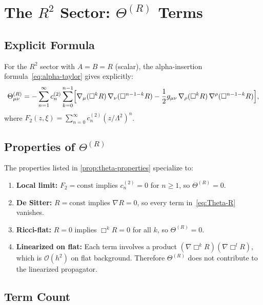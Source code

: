 \documentclass[11pt,a4paper]{article}
\theoremstyle{plain}
\theoremstyle{definition}
\begin{document}
\section{The $R^2$ Sector: $\Theta^{(R)}$ Terms}\label{sec:theta-R}

\subsection{Explicit Formula}

For the $R^2$ sector with $A = B = R$ (scalar), the alpha-insertion
formula~\eqref{eq:alpha-taylor} gives explicitly:
\begin{equation}\label{eq:Theta-R}
  \Theta^{(R)}_{\mu\nu} = -\sum_{n=1}^{\infty} c_n^{(2)}
  \sum_{k=0}^{n-1}
  \Bigl[\nabla_\mu(\Box^k R)\,\nabla_\nu(\Box^{n-1-k} R)
  - \frac{1}{2}g_{\mu\nu}\,\nabla_\rho(\Box^k R)\,
  \nabla^\rho(\Box^{n-1-k} R)\Bigr],
\end{equation}
where $F_2(z,\xi) = \sum_{n=0}^{\infty} c_n^{(2)}(z/\Lambda^2)^n$.

\subsection{Properties of $\Theta^{(R)}$}

The properties listed in \cref{prop:theta-properties} specialize to:
\begin{enumerate}[nosep]
  \item \textbf{Local limit:} $F_2 = \mathrm{const}$ implies
    $c_n^{(2)} = 0$ for $n \geq 1$, so $\Theta^{(R)} = 0$.
  \item \textbf{De Sitter:} $R = \mathrm{const}$ implies
    $\nabla R = 0$, so every term in~\eqref{eq:Theta-R} vanishes.
  \item \textbf{Ricci-flat:} $R = 0$ implies
    $\Box^k R = 0$ for all $k$, so $\Theta^{(R)} = 0$.
  \item \textbf{Linearized on flat:} Each term involves a product
    $(\nabla\Box^k R)(\nabla\Box^l R)$, which is $\mathcal{O}(h^2)$
    on flat background. Therefore $\Theta^{(R)}$ does not contribute
    to the linearized propagator.
\end{enumerate}

\subsection{Term Count}
\end{document}

